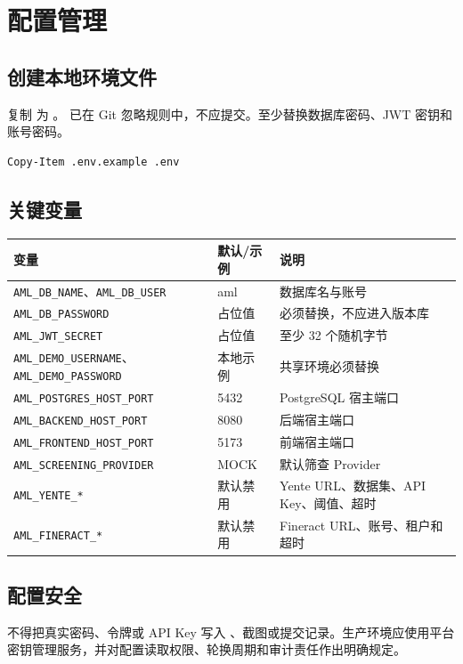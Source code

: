 \documentclass[UTF8,openany,zihao=-4]{ctexrep}
\begin{document}
\chapter{配置管理}
\section{创建本地环境文件}
复制  为 。 已在 Git 忽略规则中，不应提交。至少替换数据库密码、JWT 密钥和账号密码。
\begin{lstlisting}
Copy-Item .env.example .env
\end{lstlisting}

\Needspace{0.62\textheight}
\section{关键变量}
\begin{longtable}{p{}p{}p{}}
\toprule 变量 & 默认/示例 & 说明 \\ \midrule
\texttt{AML\_DB\_NAME}、\newline\texttt{AML\_DB\_USER} & aml & 数据库名与账号 \\
\texttt{AML\_DB\_PASSWORD} & 占位值 & 必须替换，不应进入版本库 \\
\texttt{AML\_JWT\_SECRET} & 占位值 & 至少 32 个随机字节 \\
\texttt{AML\_DEMO\_USERNAME}、\newline\texttt{AML\_DEMO\_PASSWORD} & 本地示例 & 共享环境必须替换 \\
\texttt{AML\_POSTGRES\_HOST\_PORT} & 5432 & PostgreSQL 宿主端口 \\
\texttt{AML\_BACKEND\_HOST\_PORT} & 8080 & 后端宿主端口 \\
\texttt{AML\_FRONTEND\_HOST\_PORT} & 5173 & 前端宿主端口 \\
\texttt{AML\_SCREENING\_PROVIDER} & MOCK & 默认筛查 Provider \\
\texttt{AML\_YENTE\_*} & 默认禁用 & Yente URL、数据集、API Key、阈值、超时 \\
\texttt{AML\_FINERACT\_*} & 默认禁用 & Fineract URL、账号、租户和超时 \\
\bottomrule
\end{longtable}

\section{配置安全}
不得把真实密码、令牌或 API Key 写入 、截图或提交记录。生产环境应使用平台密钥管理服务，并对配置读取权限、轮换周期和审计责任作出明确规定。
\end{document}
